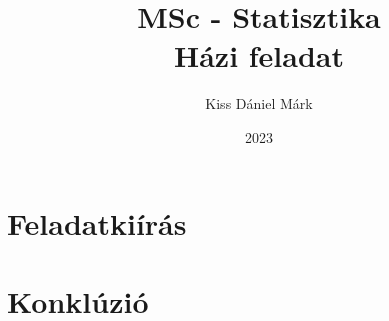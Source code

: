 \documentclass[11pt,a4paper,oneside]{report}
\title{\Huge{MSc - Statisztika}\\Házi feladat}
\author{\huge{Kiss Dániel Márk}}
\date{2023}
\begin{document}
\maketitle
\newpage
\tableofcontents
\pagebreak

\chapter{Feladatkiírás}

\chapter{Konklúzió}
\end{document}
